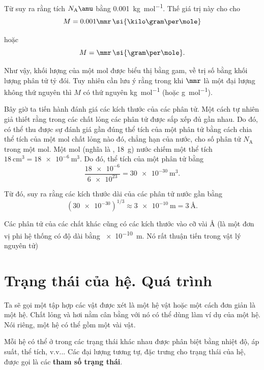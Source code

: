 Từ  suy ra rằng tích $N_{\text{A}}\amu$ bằng \SI{0.001}{\kilo\gram\per\mole}. Thế giá trị này cho  cho
\begin{equation}\label{eq:10_4}
	M = 0.001 \mmr\, \si{\kilo\gram\per\mole}
\end{equation}

\noindent
hoặc
\begin{equation}\label{eq:10_5}
	M = \mmr\, \si{\gram\per\mole}.
\end{equation}

\noindent
Như vậy, khối lượng của một mol được biểu thị bằng gam, về trị số bằng khối lượng phân tử tỷ đói. Tuy nhiên cần lưu ý rằng trong khi $\mmr$ là một đại lượng không thứ nguyên thì $M$ có thứ nguyên \si{\kilo\gram\per\mole} (hoặc \si{\gram\per\mole}).

Bây giờ ta tiến hành đánh giá các kích thước của các phân tử. Một cách tự nhiên giả thiết rằng trong các chất lỏng các phân tử được sắp xếp đủ gần nhau. Do đó, có thể thu được sự đánh giá gần đúng thể tích của một phân tử bằng cách chia thể tích của một mol chất lỏng nào đó, chẳng hạn của nước, cho số phân tử $N_{\text{A}}$ trong một mol. Một mol (nghĩa là \ie, \SI{18}{\gram}) nước chiếm một thể tích  $\SI{18}{\centi\metre\cubed}=\SI{18e-6}{\metre\cubed}$. Do đó, thể tích của một phân tử bằng
\begin{equation*}
	\frac{\num{18e-6}}{\num{6e23}} = \SI{30e-30}{\metre\cubed}.
\end{equation*}

\noindent
Từ đó, suy ra rằng các kích thước dài của các phân tử nước gần bằng
\begin{equation*}
	\left(\num{30e-30}\right)^{1/3} \approx \SI{3e-10}{\metre} = \SI{3}{\angstrom}.
\end{equation*}

Các phân tử của các chất khác cũng có các kích thước vào cỡ vài \si{\angstrom} (là một đơn vị phi hệ thống có độ dài bằng \SI{e-10}{\metre}. Nó rất thuận tiến trong vật lý nguyên tử)

\section{Trạng thái của hệ. Quá trình}\label{sec:10_3}

Ta sẽ gọi một tập hợp các vật được xét là một hệ vật hoặc một cách đơn giản là một hệ. Chất lỏng và hơi nằm cân bằng với nó có thể dùng làm ví dụ của một hệ. Nói riêng, một hệ có thể gồm một vài vật.

Mỗi hệ có thể ở trong các trạng thái khác nhau được phân biệt bằng nhiệt độ, áp suất, thể tích, v.v... Các đại lượng tương tự, đặc trưng cho trạng thái của hệ, được gọi là các \textbf{tham số trạng thái}.

